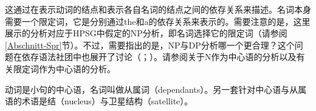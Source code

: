 这通过在表示动词的结点和表示各自名词的结点之间的依存关系来描述。名词本身需要一个限定词，它是分别通过the和a的依存关系来表示的。需要注意的是，这里展示的分析对应于HPSG中假定的NP分析，即名词选择它的限定词（请参阅\ref{Abschnitt-Spr}节）。不过，需要指出的是，NP与DP分析哪一个更合理？这个问题在依存语法社团中也展开了讨论（\citealp[]{Hudson84a-u}；\citealp{vanLangendonck94a,Hudson2004a}）。请参阅\citet{Engel77}关于N作为中心语的分析以及\citet[]{Welke2011a-u}有关限定词作为中心语的分析。

动词是小句的中心语，名词叫做从属词（dependants）。另一套针对中心语与从属语的术语是结（nucleus）与卫星结构（satellite）。

